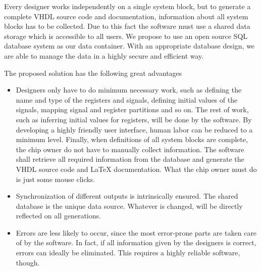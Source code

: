 Every designer works independently on a single system block, but to generate a complete VHDL source code and documentation, information about all system blocks has to be collected. Due to this fact the software must use a shared data storage which is accessible to all users. We propose to use an open source SQL database system as our data container. With an appropriate database design, we are able to manage the data in a highly secure and efficient way.

The proposed solution has the following great advantages
\begin{itemize}
\item Designers only have to do minimum necessary work, such as defining the name and type of the registers and signals, defining initial values of the signals, mapping signal and register partitions and so on. The rest of work, such as inferring initial values for registers, will be done by the software. By developing a highly friendly user interface, human labor can be reduced to a minimum level. Finally, when definitions of all system blocks are complete, the chip owner do not have to manually collect information. The software shall retrieve all required information from the database and generate the VHDL source code and LaTeX documentation. What the chip owner must do is just some mouse clicks.
\item Synchronization of different outputs is intrinsically ensured. The shared database is the unique data source. Whatever is changed, will be directly reflected on all generations.
\item Errors are less likely to occur, since the most error-prone parts are taken care of by the software. In fact, if all information given by the designers is correct, errors can ideally be eliminated. This requires a highly reliable software, though.
\end{itemize}